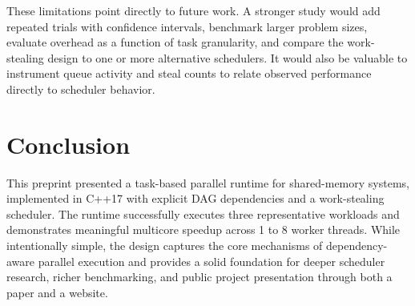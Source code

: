 \documentclass[10pt]{article}
\begin{document}
These limitations point directly to future work. A stronger study would add repeated trials with confidence intervals, benchmark larger problem sizes, evaluate overhead as a function of task granularity, and compare the work-stealing design to one or more alternative schedulers. It would also be valuable to instrument queue activity and steal counts to relate observed performance directly to scheduler behavior.

\section{Conclusion}
This preprint presented a task-based parallel runtime for shared-memory systems, implemented in C++17 with explicit DAG dependencies and a work-stealing scheduler. The runtime successfully executes three representative workloads and demonstrates meaningful multicore speedup across 1 to 8 worker threads. While intentionally simple, the design captures the core mechanisms of dependency-aware parallel execution and provides a solid foundation for deeper scheduler research, richer benchmarking, and public project presentation through both a paper and a website.
\end{document}

